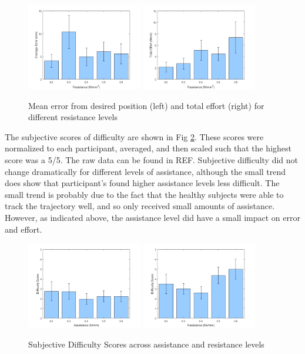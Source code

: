 \documentclass[12pt]{report}
\begin{document}
\begin{figure}[h]
	\centering
	\includegraphics[width=0.45\textwidth]{err_resist}
	\includegraphics[width=0.45\textwidth]{eff_resist}
	\caption{Mean error from desired position (left) and total effort (right) for different resistance levels}
	\label{fig:resist}
\end{figure}		


The subjective scores of difficulty are shown in Fig \ref{fig:difficulty}. These scores were normalized to each participant, averaged, and then scaled such that the highest score was a 5/5. The raw data can be found in REF. Subjective difficulty did not change dramatically for different levels of assistance, although the small trend does show that participant's found higher assistance levels less difficult. The small trend is probably due to the fact that the healthy subjects were able to track the trajectory well, and so only received small amounts of assistance. However, as indicated above, the assistance level did have a small impact on error and effort. 

\begin{figure}[h]
	\centering
	\includegraphics[width=0.45\textwidth]{diff_assist}
	\includegraphics[width=0.45\textwidth]{diff_resist}
	\caption{Subjective Difficulty Scores across assistance and resistance levels}
	\label{fig:difficulty}
\end{figure}	
\end{document}
